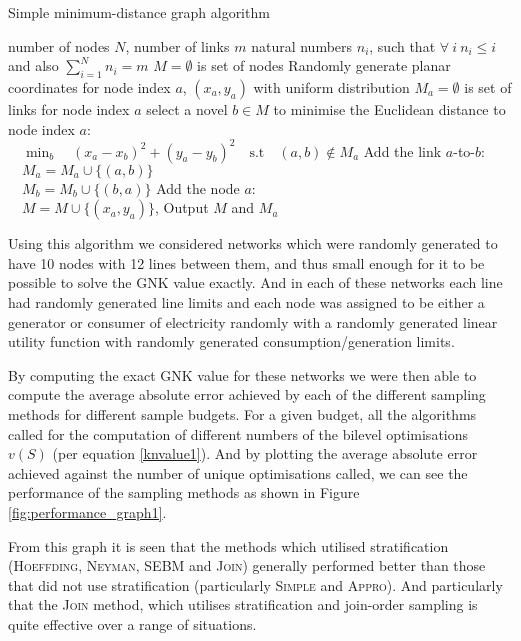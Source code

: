 \begin{algorithm}[]
\caption{Simple minimum-distance graph algorithm}
\label{alg1}
\begin{algorithmic}
    \REQUIRE number of nodes $N$, number of links $m$
    \REQUIRE natural numbers $n_i$, such that $\forall~i~n_i\leq i$ and also $\sum_{i=1}^Nn_i=m$
    \STATE $M=\emptyset$ is set of nodes
        \STATE Randomly generate planar coordinates for node index $a$, $(x_a ,y_a)$ with uniform distribution
        \STATE $M_a=\emptyset$ is set of links for node index $a$
            \STATE select a novel $b\in M$ to minimise the Euclidean distance to node index $a$:\\ $\quad\min_b\quad (x_a-x_b)^2+(y_a-y_b)^2\quad\text{s.t}\quad (a, b)\notin M_a$
            \STATE Add the link $a$-to-$b$:\\ $\quad M_a=M_a\cup \{(a, b)\}$\\ $\quad M_b=M_b\cup \{(b, a)\}$
        \ENDFOR
        \STATE Add the node $a$:\\ $\quad M=M\cup \{(x_a ,y_a)\}$, 
    \ENDFOR
    \STATE Output $M$ and $M_a$ 
\end{algorithmic}
\end{algorithm}

Using this algorithm we considered networks which were randomly generated to have 10 nodes with 12 lines between them, and thus small enough for it to be possible to solve the GNK value exactly.
And in each of these networks each line had randomly generated line limits and each node was assigned to be either a generator or consumer of electricity randomly with a randomly generated linear utility function with randomly generated consumption/generation limits.

By computing the exact GNK value for these networks we were then able to compute the average absolute error achieved by each of the different sampling methods for different sample budgets.
For a given budget, all the algorithms called for the computation of different numbers of the bilevel optimisations $v(S)$ (per equation \ref{knvalue1}).
And by plotting the average absolute error achieved against the number of unique optimisations called, we can see the performance of the sampling methods as shown in Figure \ref{fig:performance_graph1}.

From this graph it is seen that the methods which utilised stratification (\textsc{Hoeffding}, \textsc{Neyman}, \textsc{SEBM} and \textsc{Join})  generally performed better than those that did not use stratification (particularly \textsc{Simple} and \textsc{Appro}).
And particularly that the \textsc{Join} method, which utilises stratification and join-order sampling is quite effective over a range of situations.

